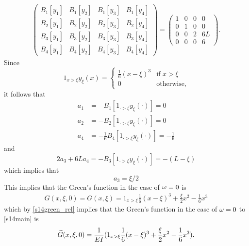 \begin{align*}
\begin{pmatrix}
B_{1}[y_1] & B_{1}[y_2] & B_{1}[y_3] & B_{1}[y_4]\\
B_{2}[y_1] & B_{2}[y_2] & B_{2}[y_3] & B_{2}[y_4]\\
B_{3}[y_1] & B_{3}[y_2] & B_{3}[y_3] & B_{3}[y_4]\\
B_{4}[y_1] & B_{4}[y_2] & B_{4}[y_3] & B_{4}[y_4]
\end{pmatrix} =
\begin{pmatrix}
1 & 0 & 0 & 0\\
0 & 1 & 0 & 0\\
0 & 0 & 2 & 6L\\
0 & 0 & 0 & 6
\end{pmatrix}.
\end{align*}
Since
\begin{equation*}
1_{x > \xi}y_{\xi}(x) =
\begin{cases}
\frac{1}{6}(x- \xi)^{3} & \text{if } x > \xi\\
0 & \text{otherwise,}
\end{cases}
\end{equation*}
it follows that
\begin{align*}
a_{1} &= -B_{1}[1_{\cdot > \xi}y_{\xi}(\cdot)] = 0\\
a_{2} &= -B_{2}[1_{\cdot > \xi}y_{\xi}(\cdot)] = 0\\
a_{4} &= -\frac{1}{6}B_{4}[1_{\cdot > \xi}y_{\xi}(\cdot)] = -\frac{1}{6}
\end{align*}
and $$2a_{3} + 6La_{4} = -B_{3}[1_{\cdot > \xi}y_{\xi}(\cdot)] = -(L - \xi)$$ which implies that
$$a_{3} = \xi/2$$
This implies that the Green's function in the case of $\omega = 0$ is
\begin{align*}
G(x, \xi, 0) = G(x, \xi) = 1_{x > \xi}\frac{1}{6}(x - \xi)^{3} + \frac{\xi}{2}x^{2} - \frac{1}{6}x^{3}
\end{align*}
which by \eqref{s14green_rel} implies that the Green's function in the case of $\omega = 0$ to \eqref{s14main} is
\begin{align}\label{s14green}
\widetilde{G}(x, \xi, 0) = \frac{1}{EI}(1_{x > \xi}\frac{1}{6}(x - \xi)^{3} + \frac{\xi}{2}x^{2} - \frac{1}{6}x^{3}).
\end{align}


